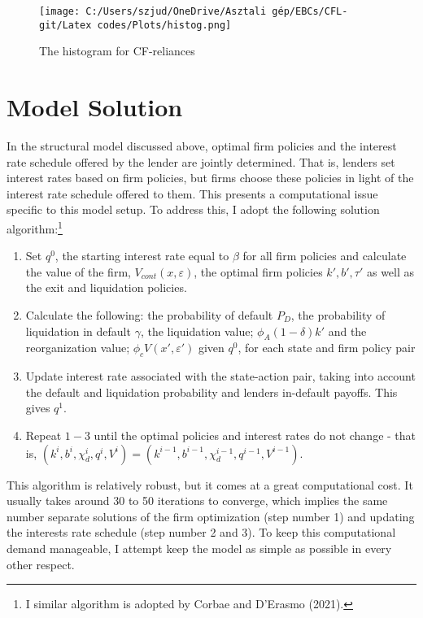 \documentclass[12pt]{article}
\begin{document}
\begin{figure}[H]  %
    \centering
    \texttt{[image: C:/Users/szjud/OneDrive/Asztali gép/EBCs/CFL-git/Latex codes/Plots/histog.png]}
    \caption{The histogram for CF-reliances} \label{chart:histog}
\end{figure}


\newpage

\appendix
\section{Model Solution \label{sec: qualitative analysis}}

In the structural model discussed above, optimal firm policies and the interest rate schedule offered by the lender are jointly determined. That is, lenders set interest rates based on firm policies, but firms choose these policies in light of the interest rate schedule offered to them. This presents a computational issue specific to this model setup. To address this, I adopt the following solution algorithm:\footnote{I similar algorithm is adopted by Corbae and D'Erasmo (2021).}
\begin{enumerate}
    \item Set $q^0$, the starting interest rate equal to $\beta$ for all firm policies and calculate the value of the firm, $V_{cont}(x,\varepsilon)$, the optimal firm policies $k', b', \tau'$ as well as the exit and liquidation policies. 
    \item Calculate the following: the probability of default $P_D$, the probability of liquidation in default $\gamma$, the liquidation value; $\phi_A (1-\delta) k'$ and the reorganization value; $\phi_c V (x', \varepsilon')$ given $q^0$, for each state and firm policy pair
    \item Update interest rate associated with the state-action pair, taking into account the default and liquidation probability and lenders in-default payoffs. This gives  $q^1$. 
    \item Repeat $1-3$ until the optimal policies and interest rates do not change - that is, $ (k^{i},b^{i},\chi_d^{i},q^{i}, V^{i}) = (k^{i-1},b^{i-1},\chi_d^{i-1}, q^{i-1}, V^{i-1}) $.
\end{enumerate}
This algorithm is relatively robust, but it comes at a great computational cost. It usually takes around 30 to 50 iterations to converge, which implies the same number separate solutions of the firm optimization (step number 1) and updating the interests rate schedule (step number 2 and 3). To keep this computational demand manageable, I attempt keep the model as simple as possible in every other respect.
\end{document}
